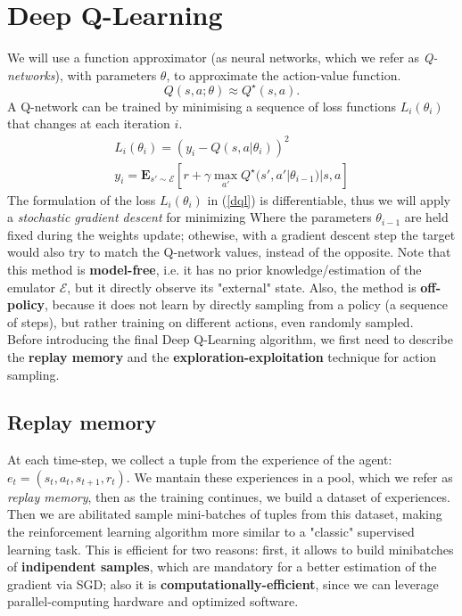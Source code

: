 \documentclass{article}
\begin{document}
\section{Deep Q-Learning}

We will use a function approximator (as neural networks, which we refer as \textit{Q-networks}), with parameters $\theta$, to approximate the action-value function.
\begin{equation}
	Q(s, a; \theta) \approx Q ^\star (s, a). 
\end{equation}
A Q-network can be trained by minimising a sequence of loss functions $L_i(\theta _i )$ that changes at each
iteration $i$.
\begin{equation}
\label{dql}
\begin{aligned}
	L_i(\theta _i ) = (y_i - Q(s,a|\theta_i))^2 \\
	y_i = \mathbf{E}_{s' \sim \mathcal{E}} [ r + \gamma \max_{a'} Q^\star(s', a'|\theta_{i-1}) | s, a  ]
\end{aligned}
\end{equation}
The formulation of the loss $L_i(\theta_i)$ in (\ref{dql}) is differentiable, thus we will apply a \textit{stochastic gradient descent} for minimizing 
Where the parameters $\theta_{i-1}$ are held fixed during the weights update; othewise, with a gradient descent step the target would also try to match the Q-network values, instead of the opposite. Note that this method is \textbf{model-free}, i.e. it has no prior knowledge/estimation of the emulator $\mathcal{E}$, but it directly observe its "external" state. Also, the method is \textbf{off-policy}, because it does not learn by directly sampling from a policy (a sequence of steps), but rather training on different actions, even randomly sampled.\\
Before introducing the final Deep Q-Learning algorithm, we first need to describe the \textbf{replay memory} and the \textbf{exploration-exploitation} technique for action sampling.
\subsection{Replay memory}
At each time-step, we collect a tuple from the experience of the agent: $e_t = (s_t, a_t, s_{t+1}, r_t)$. We mantain these experiences in a pool, which we refer as \textit{replay memory}, then as the training continues, we build a dataset of experiences. Then we are abilitated sample mini-batches of tuples from this dataset, making the reinforcement learning algorithm more similar to a "classic" supervised learning task. This is efficient for two reasons: first, it allows to build minibatches of \textbf{indipendent samples}, which are mandatory for a better estimation of the gradient via SGD; also it is \textbf{computationally-efficient}, since we can leverage parallel-computing hardware and optimized software.
\end{document}
